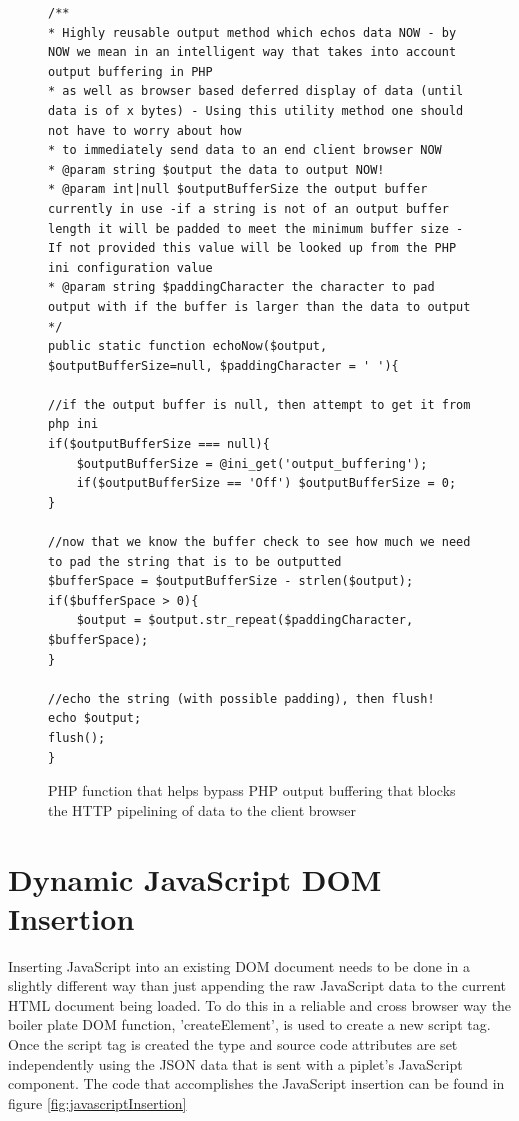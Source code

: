 \documentclass[12pt]{report}
\begin{document}
\begin{figure}[H]
\label{fig:echoNowCode}
\begin{lstlisting}
/**
* Highly reusable output method which echos data NOW - by NOW we mean in an intelligent way that takes into account output buffering in PHP
* as well as browser based deferred display of data (until data is of x bytes) - Using this utility method one should not have to worry about how 
* to immediately send data to an end client browser NOW
* @param string $output the data to output NOW!
* @param int|null $outputBufferSize the output buffer currently in use -if a string is not of an output buffer length it will be padded to meet the minimum buffer size - If not provided this value will be looked up from the PHP ini configuration value 
* @param string $paddingCharacter the character to pad output with if the buffer is larger than the data to output
*/
public static function echoNow($output, $outputBufferSize=null, $paddingCharacter = ' '){

//if the output buffer is null, then attempt to get it from php ini
if($outputBufferSize === null){
	$outputBufferSize = @ini_get('output_buffering');
	if($outputBufferSize == 'Off') $outputBufferSize = 0;
}
		
//now that we know the buffer check to see how much we need to pad the string that is to be outputted
$bufferSpace = $outputBufferSize - strlen($output);
if($bufferSpace > 0){
	$output = $output.str_repeat($paddingCharacter, $bufferSpace);
}

//echo the string (with possible padding), then flush!
echo $output;
flush();
}
\end{lstlisting}
\caption{PHP function that helps bypass PHP output buffering that blocks the HTTP pipelining of data to the client browser}
\end{figure}


\section{Dynamic JavaScript DOM Insertion}

Inserting JavaScript into an existing DOM document needs to be done in a slightly different way than just appending the raw JavaScript data to the current HTML document being loaded. To do this in a reliable and cross browser way the boiler plate DOM function, 'createElement', is used to create a new script tag. Once the script tag is created the type and source code attributes are set independently using the JSON data that is sent with a piplet's JavaScript component. The code that accomplishes the JavaScript insertion can be found in figure \ref{fig:javascriptInsertion}
\end{document}
